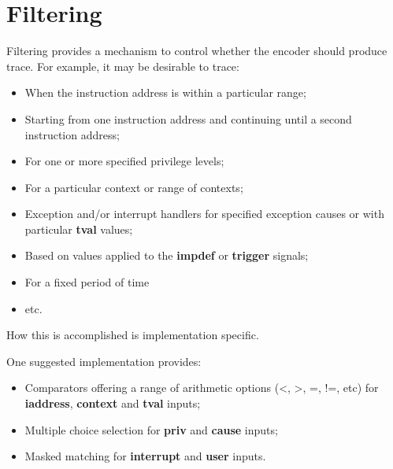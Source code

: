 \chapter{Filtering} \label{ch:filtering}

Filtering provides a mechanism to control whether the encoder should produce trace.  For example,
it may be desirable to trace:

\begin{itemize}
  \item When the instruction address is within a particular range;
  \item Starting from one instruction address and continuing until a second instruction address;
  \item For one or more specified privilege levels;
  \item For a particular context or range of contexts;
  \item Exception and/or interrupt handlers for specified exception causes or with particular \textbf{tval} values;
  \item Based on values applied to the \textbf{impdef} or \textbf{trigger} signals;
  \item For a fixed period of time
  \item etc.
\end{itemize}

How this is accomplished is implementation specific.  

One suggested implementation provides: 

\begin{itemize}
  \item Comparators offering a range of arithmetic options (<, >, =, !=, etc) for \textbf{iaddress}, 
    \textbf{context} and \textbf{tval} inputs;
  \item Multiple choice selection for \textbf{priv} and \textbf{cause} inputs;
  \item Masked matching for \textbf{interrupt} and \textbf{user} inputs.
\end{itemize}


